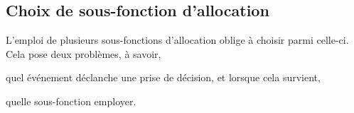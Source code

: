 
\subsection{Choix de sous-fonction d'allocation}
\label{repl:subsec:allocationchoice}

L'emploi de plusieurs sous-fonctions d'allocation oblige à choisir parmi
celle-ci. Cela pose deux problèmes, à savoir,
\begin{inparaenum}[(i)]
\item quel événement déclanche une prise de décision, et lorsque cela survient, 
\item quelle sous-fonction employer.
\end{inparaenum}
